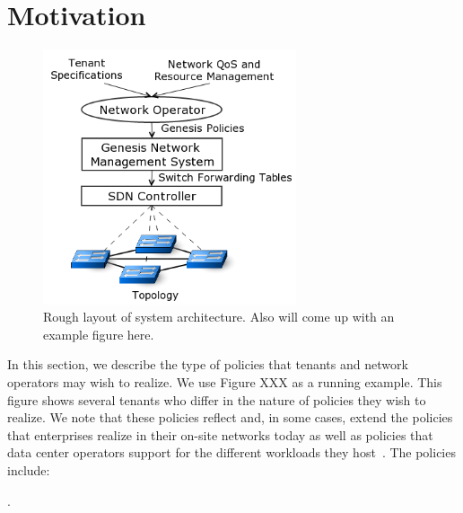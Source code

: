 \section{Motivation}
\begin{figure}
	\includegraphics[height=7.5cm,right]{figures/architecture.png}
	\caption{Rough layout of system architecture. Also will come up with an example figure here.}
	\label{fig:architecture}
\end{figure}
In this section, we describe the type of policies that tenants and
network operators may wish to realize. %
We use Figure XXX as a running example. This figure shows several
tenants who differ in the nature of policies they wish to realize. We
note that these policies reflect and, in some cases, extend the
policies that enterprises realize in their on-site networks today as
well as policies that data center operators support for the different
workloads they host~\cite{mpa-imc15}.  The policies include:

.




